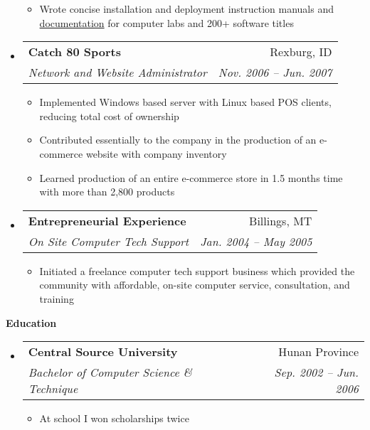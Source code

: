 \documentclass[letterpaper,11pt]{article}
\makeatletter
\newcommand{\resitem}[1]{\item #1 \vspace{-2pt}}
\newcommand{\resheading}[1]{{\large \colorbox{mygrey}{\begin{minipage}{\textwidth}{\textbf{#1 \vphantom{p\^{E}}}}\end{minipage}}}}
\newcommand{\ressubheading}[4]{
\begin{tabular*}{6.5in}{l@{\extracolsep{\fill}}r}
  \textbf{#1} & #2 \\
  \textit{#3} & \textit{#4} \\
\end{tabular*}\vspace{-6pt}}
\makeatother
\begin{document}
\begin{itemize}
{\begin{itemize}
      \resitem{Wrote concise installation and deployment instruction manuals and \href{http://www.derekhildreth.com/portfolio/Documentation/Lab_Binder_Documentation_BYUI_Work.pdf}{documentation} for computer labs and 200+ software titles}

    \end{itemize}
  }

\item \ressubheading{Catch 80 Sports}{Rexburg, ID}{Network and Website Administrator}{Nov. 2006 -- Jun. 2007}
  { \footnotesize
    \begin{itemize}
      \resitem{Implemented Windows based server with Linux based POS clients, reducing total cost of ownership}

      \resitem{Contributed essentially to the company in the production of an e-commerce website with company inventory}

      \resitem{Learned production of an entire e-commerce store in 1.5 months time with more than 2,800 products}

    \end{itemize}
  }

\item \ressubheading{Entrepreneurial Experience}{Billings, MT}{On Site Computer Tech Support}{Jan. 2004 -- May 2005}
  { \footnotesize        
    \begin{itemize}
    \item Initiated a freelance computer tech support business which provided the community with affordable, on-site computer service, consultation, and training
    \end{itemize}
  }

\end{itemize}  %

\resheading{Education}
\begin{itemize}
\item \ressubheading{Central Source University}{Hunan Province}{%
    Bachelor of Computer Science \& Technique}{Sep. 2002 -- Jun. 2006}

  { \footnotesize
    \begin{itemize}
      \resitem{At school I won scholarships twice}
    \end{itemize}
  }

\end{itemize} %
\end{document}
